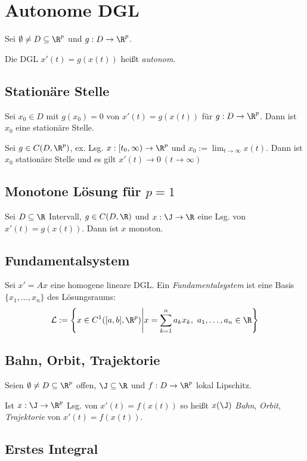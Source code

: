\section*{Autonome DGL}

Sei \(\emptyset \neq D \subseteq \R^p\) und \(g : D \to \R^p\).

Die DGL \(x'(t)=g(x(t))\) heißt \emph{autonom}.

\subsection*{Stationäre Stelle}

Sei \(x_0 \in D\) mit \(g(x_0)=0\) von \(x'(t)=g(x(t))\) für \(g : D \to \R^p\). Dann ist \(x_0\) eine stationäre Stelle.

\spacing

Sei \(g \in C(D,\R^p)\), ex. Lsg. \(x: [t_0,\infty) \to \R^p\) und \(x_0 := \lim_{t \to \infty} x(t)\). Dann ist \(x_0\) stationäre Stelle und es gilt \(x'(t) \to 0 \ (t \to \infty)\)

\subsection*{Monotone Lösung für \(p=1\)}

Sei \(D \subseteq \R\) Intervall, \(g \in C(D,\R)\) und \(x : \J \to \R\) eine Lsg. von \(x'(t)=g(x(t))\). Dann ist \(x\) monoton.

\subsection*{Fundamentalsystem}

Sei \(x'=Ax\) eine homogene lineare DGL. Ein \emph{Fundamentalsystem} ist eine Basis \(\{x_1,\dots,x_n\}\) des Lösungsraums: \[\mathcal{L} := \left\{ x \in C^1([a,b],\R^p) \middle| x=\sum_{k=1}^n a_k x_k, \ a_1,\dots,a_n \in \R \right\}\]

\subsection*{Bahn, Orbit, Trajektorie}

Seien \(\emptyset \neq D \subseteq \R^p\) offen, \(\J \subseteq \R\) und \(f : D \to \R^p\) lokal Lipschitz.

Ist \(x : \J \to \R^p\) Lsg. von \(x'(t)=f(x(t))\) so heißt \(x(\J)\) \emph{Bahn}, \emph{Orbit}, \emph{Trajektorie} von \(x'(t)=f(x(t))\).

\subsection*{Erstes Integral}

